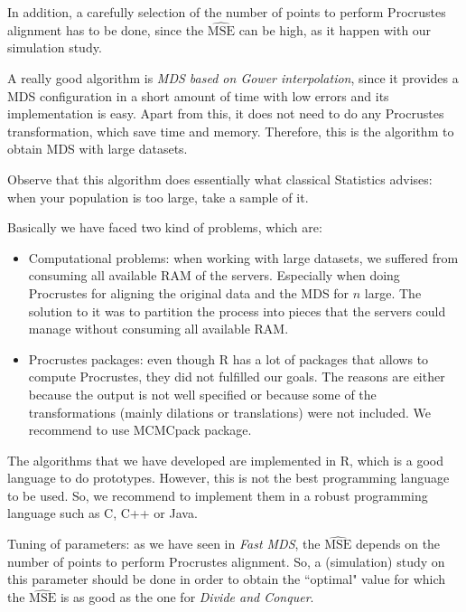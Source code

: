 \documentclass[11pt]{report}
\begin{document}
\indent In addition, a carefully selection of the number of points to perform 
Procrustes alignment has to be done, since the $\widehat{\mbox{MSE}}$
can be high, as it happen with our simulation study.

\indent A really good algorithm is \textit{MDS based on Gower interpolation},
since it provides a MDS configuration in a short amount of time with low errors 
and its implementation is easy. Apart from this, it does not need to do 
any Procrustes transformation, which save time and memory. Therefore, this 
is the algorithm to obtain MDS with large datasets.

\indent Observe that this algorithm does essentially what classical Statistics 
advises: when your population is too large, take a sample of it. \\


\indent Basically we have faced two kind of problems, which are:

\begin{itemize}
\item Computational problems: when working with large datasets, we suffered from
consuming all available RAM of the servers. Especially when doing Procrustes 
for aligning the original data and the MDS for $n$ large. The solution to 
it was to partition the process into pieces that the servers could manage 
without consuming all available RAM.

\item Procrustes packages: even though \textsf{R} has a lot of packages that
allows to compute Procrustes, they did not fulfilled our goals. The reasons are
either because the output is not well specified or because some of the 
transformations (mainly dilations or translations) were not included. We 
recommend to use \textsf{MCMCpack} package.

\end{itemize}


\indent The algorithms that we have developed are implemented in \textsf{R},
which is a good language to do prototypes. However, this is not the best
programming language to be used. So, we recommend to implement them in a robust 
programming language such as \textsf{C}, \textsf{C++} or \textsf{Java}.

\indent Tuning of parameters: as we have seen in \textit{Fast MDS}, the 
$\widehat{\mbox{MSE}}$ depends on the number of points to perform Procrustes
alignment. So, a (simulation) study on this parameter should be done in order 
to obtain the ``optimal" value for which the $\widehat{\mbox{MSE}}$ is as good
as the one for \textit{Divide and Conquer}.
\end{document}
